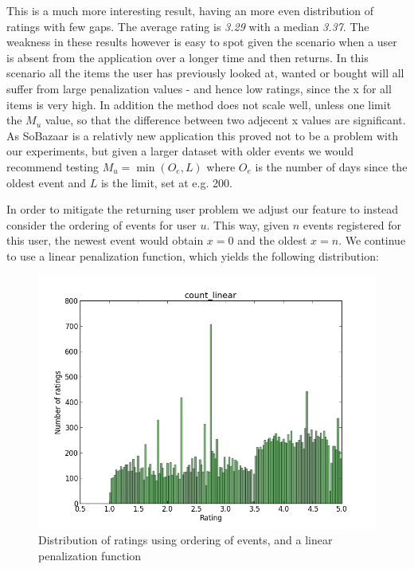 This is a much more interesting result, having an more even distribution of
ratings with few gaps. The average rating is \textit{3.29} with a median
\textit{3.37}. The weakness in these results however is easy to spot given the
scenario when a user is absent from the application over a longer time and then
returns. In this scenario all the items the user has previously looked at,
wanted or bought will all suffer from large penalization values - and hence low
ratings, since the x for all items is very high. In addition the method does
not scale well, unless one limit the $M_u$ value, so that the difference
between two adjecent x values are significant. As SoBazaar is a relativly new
application this proved not to be a problem with our experiments, but given a
larger dataset with older events we would recommend testing $M_u = \min(O_e,
L)$ where $O_e$ is the number of days since the oldest event and $L$ is the
limit, set at e.g. 200.

In order to mitigate the returning user problem we adjust our feature to
instead consider the ordering of events for user $u$. This way, given $n$
events registered for this user, the newest event would obtain $x=0$ and the
oldest $x=n$. We continue to use a linear penalization function, which yields
the following distribution:

\begin{figure}[H]
  \centering
  \includegraphics[scale=0.6]{image/dist-count-linear}
  \caption{Distribution of ratings using ordering of events, and a linear
 penalization function}
  \label{fig:dist-count-linear}
\end{figure}

